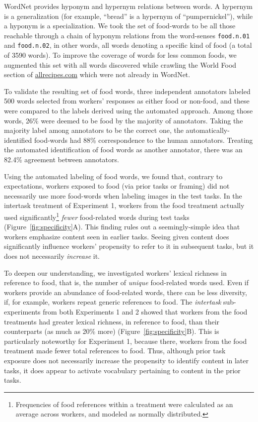 \documentclass{sigchi}
\begin{document}
WordNet provides
hyponym and hypernym relations between words.  A hypernym is a 
generalization (for example, ``bread'' is a hypernym of ``pumpernickel''), 
while a hyponym is a specialization.  We took the set of food-words
to be all those reachable through
a chain of hyponym relations from the word-senses 
\texttt{food.n.01} and \texttt{food.n.02}, in other words, all words
denoting a specific kind of food (a total of 3590 words).  
To improve the coverage of words for
less common foods, we augmented this set with all words
discovered while crawling the World Food section of \url{allrecipes.com} 
which were not already in WordNet.  

To validate the resulting set of 
food words, three independent annotators labeled 500 words selected from 
workers' responses as either food or non-food, and these were
compared to the labels derived using the automated approach.
Among those words, 26\% were 
deemed to be food by the majority of annotators.  
Taking the majority label among annotators to be the correct one, 
the automatically-identified food-words
had 88\% correspondence to the human annotators.  Treating the
automated identification of food words as another annotator, there 
was an 82.4\% agreement between annotators.

Using the automated labeling of food words, we found that, contrary to
expectations,
workers exposed to food (via prior tasks or framing) did not necessarily
use more food-words when labeling images in the test tasks.
In the intertask treatment of Experiment 1, workers from the food treatment
actually used significantly\footnote{
  Frequencies of food references within a treatment were calculated as
  an average across workers, and modeled as normally distributed.
} \textit{fewer} food-related words 
during test tasks (Figure~\ref{fig:specificity}A).  This finding
rules out a seemingly-simple idea that workers emphasize
content seen in earlier tasks.  Seeing given content does significantly 
influence workers' propensity to refer to it in subsequent tasks, but it 
does not necessarily \textit{increase} it.

To deepen our understanding, we investigated workers' lexical richness in 
reference to food, that is, the number of \textit{unique} food-related 
words used.  Even if workers provide an abundance of food-related words, 
there can be less diversity, if, for example, workers repeat generic 
references to food.
The \textit{intertask} sub-experiments from both Experiments 1 and 2 showed
that workers from the food treatments had
greater lexical richness, in reference to food, than their counterparts 
(as much as 20\% more) (Figure~\ref{fig:specificity}B).  
This is particularly noteworthy for Experiment 1, because there,
workers from the food treatment made fewer total references to food.  
Thus, although prior task exposure does not necessarily increase the 
propensity
to identify content in later tasks, it does appear to activate vocabulary 
pertaining to content in the prior tasks.
\end{document}
